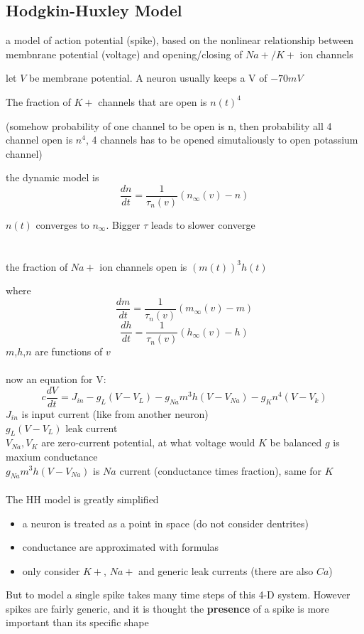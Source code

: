 \documentclass[10pt]{article}
\theoremstyle{break}
\begin{document}
\subsection{Hodgkin-Huxley Model}
a model of action potential (spike), based on the nonlinear relationship between membnrane potential (voltage) and opening/closing of $Na+/K+$ ion channels

let $V$ be membrane potential. A neuron usually keeps a V of $-70mV$

The fraction of $K+$ channels that are open is $n(t)^4$

(somehow probability of one channel to be open is n, then probability all 4 channel open is $n^4$, 4 channels has to be opened simutaliously to open potassium channel)

the dynamic model is 
$$\frac{dn}{dt}=\frac{1}{\tau_n(v)}(n_\infty(v)-n)$$

$n(t)$ converges to $n_\infty$.   Bigger $\tau$ leads to  slower converge   
\\\\\\
the fraction of $Na+$ ion channels open is $(m(t))^3h(t)$

where 
$$\frac{dm}{dt}=\frac{1}{\tau_n(v)}(m_\infty(v)-m)$$
$$\frac{dh}{dt}=\frac{1}{\tau_n(v)}(h_\infty(v)-h)$$
$m$,$h$,$n$ are functions of $v$
\\\\
now an equation for V:
$$c\frac{dV}{dt}=J_{in}-g_L(V-V_L)-g_{Na}m^3h(V-V_{Na})-g_Kn^4(V-V_k)$$
$J_{in}$ is input current (like from another neuron)\\
$g_L(V-V_L)$ leak current\\
$V_{Na}, V_K$ are zero-current potential, at what voltage would $K$ be balanced
$g$ is maxium conductance\\
$g_{Na}m^3h(V-V_{Na})$ is $Na$ current (conductance times fraction), same for $K$
\\\\
The HH model is greatly simplified
\begin{itemize}
    \item a neuron is treated as a point in space (do not consider dentrites)
    \item conductance are approximated with formulas 
    \item only consider $K+$, $Na+$ and generic leak currents (there are also $Ca$)
\end{itemize}

But to model a single spike takes many time steps of this 4-D system.
However spikes are fairly generic, and it is thought the \textbf{presence} of a spike 
is more important than its specific shape
\end{document}
